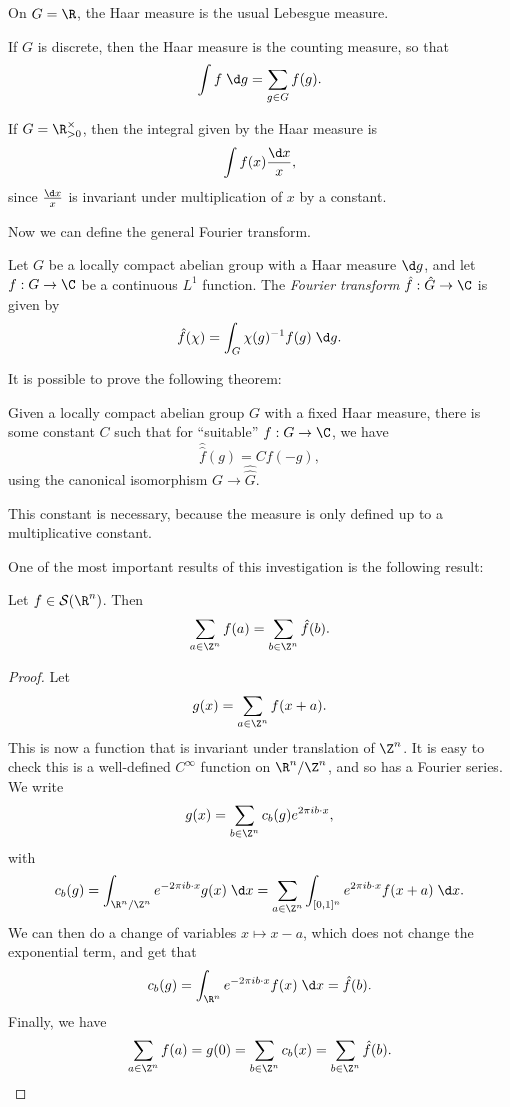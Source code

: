 \documentclass[a4paper]{article}
\begin{document}
\begin{eg}
  On $G = \R$, the Haar measure is the usual Lebesgue measure.
\end{eg}

\begin{eg}
  If $G$ is discrete, then the Haar measure is the counting measure, so that
  \[
    \int f\;\d g = \sum_{g \in G} f(g).
  \]
\end{eg}

\begin{eg}
  If $G = \R_{> 0}^\times$, then the integral given by the Haar measure is
  \[
    \int f(x) \frac{\d x}{x},
  \]
  since $\frac{\d x}{x}$ is invariant under multiplication of $x$ by a constant.
\end{eg}

Now we can define the general Fourier transform.
\begin{defi}
  Let $G$ be a locally compact abelian group with a Haar measure $\d g$, and let $f: G \to \C$ be a continuous $L^1$ function. The \emph{Fourier transform} $\hat{f}: \hat{G} \to \C$ is given by
  \[
    \hat{f}(\chi) = \int_G \chi(g)^{-1}f(g) \;\d g.
  \]
\end{defi}

It is possible to prove the following theorem:
\begin{thm}
 Given a locally compact abelian group $G$ with a fixed Haar measure, there is some constant $C$ such that for ``suitable'' $f: G \to \C$, we have
 \[
   \hat{\hat{f}}(g) = C f(-g),
 \]
 using the canonical isomorphism $G \to \hat{\hat{G}}$.
\end{thm}
This constant is necessary, because the measure is only defined up to a multiplicative constant.

One of the most important results of this investigation is the following result:
\begin{thm}
  Let $f \in \mathcal{S}(\R^n)$. Then
  \[
    \sum_{a \in \Z^n} f(a) = \sum_{b \in \Z^n} \hat{f}(b).
  \]
\end{thm}

\begin{proof}
  Let
  \[
    g(x) = \sum_{a \in \Z^n} f(x + a).
  \]
  This is now a function that is invariant under translation of $\Z^n$. It is easy to check this is a well-defined $C^\infty$ function on $\R^n/\Z^n$, and so has a Fourier series. We write
  \[
    g(x) = \sum_{b \in \Z^n} c_b(g) e^{2\pi i b \cdot x},
  \]
  with
  \[
    c_b(g) = \int_{\R^n/\Z^n} e^{-2\pi i b\cdot x} g(x) \;\d x = \sum_{a \in \Z^n} \int_{[0, 1]^n} e^{2\pi i b\cdot x} f(x + a) \;\d x.
  \]
  We can then do a change of variables $x \mapsto x - a$, which does not change the exponential term, and get that
  \[
    c_b(g) = \int_{\R^n} e^{-2\pi i b \cdot x} f(x) \;\d x = \hat{f}(b).
  \]
  Finally, we have
  \[
    \sum_{a \in \Z^n} f(a) = g(0) = \sum_{b \in \Z^n} c_b(x) = \sum_{b \in \Z^n} \hat{f}(b).
  \]
\end{proof}
\end{document}
